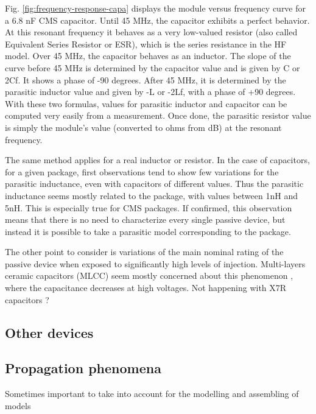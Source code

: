 Fig. \ref{fig:frequency-response-capa} displays the module versus frequency curve for a 6.8 nF CMS capacitor.
Until 45 MHz, the capacitor exhibits a perfect behavior.
At this resonant frequency it behaves as a very low-valued resistor (also called Equivalent Series Resistor or ESR), which is the series resistance in the HF model.
Over 45 MHz, the capacitor behaves as an inductor.
The slope of the curve before 45 MHz is determined by the capacitor value and is given by C\textomega{} or 2\textomega{}Cf.
It shows a phase of -90 degrees.
After 45 MHz, it is determined by the parasitic inductor value and given by -L\textomega{} or -2\textomega{}Lf, with a phase of +90 degrees.
With these two formulas, values for parasitic inductor and capacitor can be computed very easily from a measurement.
Once done, the parasitic resistor value is simply the module’s value (converted to ohms from dB) at the resonant frequency.

The same method applies for a real inductor or resistor.
In the case of capacitors, for a given package, first observations tend to show few variations for the parasitic inductance, even with capacitors of different values.
Thus the parasitic inductance seems mostly related to the package, with values between 1nH and 5nH.
This is especially true for CMS packages.
If confirmed, this observation means that there is no need to characterize every single passive device, but instead it is possible to take a parasitic model corresponding to the package.

The other point to consider is variations of the main nominal rating of the passive device when exposed to significantly high levels of injection. Multi-layers ceramic capacitors (MLCC) seem mostly concerned about this phenomenon \cite{capa-esd-cz}, where the capacitance decreases at high voltages.
Not happening with X7R capacitors ?

\subsection{Other devices}

\subsection{Propagation phenomena}

Sometimes important to take into account for the modelling and assembling of models

